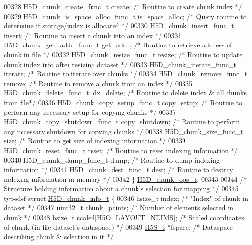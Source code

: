 \begin{DoxyCode}
00328     H5D\_chunk\_create\_func\_t create;         \textcolor{comment}{/* Routine to create chunk index */}
00329     H5D\_chunk\_is\_space\_alloc\_func\_t is\_space\_alloc;    \textcolor{comment}{/* Query routine to determine if storage/index is
       allocated */}
00330     H5D\_chunk\_insert\_func\_t insert;         \textcolor{comment}{/* Routine to insert a chunk into an index */}
00331     H5D\_chunk\_get\_addr\_func\_t get\_addr;     \textcolor{comment}{/* Routine to retrieve address of chunk in file */}
00332     H5D\_chunk\_resize\_func\_t resize;         \textcolor{comment}{/* Routine to update chunk index info after resizing dataset */}
00333     H5D\_chunk\_iterate\_func\_t iterate;       \textcolor{comment}{/* Routine to iterate over chunks */}
00334     H5D\_chunk\_remove\_func\_t \textcolor{keyword}{remove};         \textcolor{comment}{/* Routine to remove a chunk from an index */}
00335     H5D\_chunk\_delete\_func\_t idx\_delete;     \textcolor{comment}{/* Routine to delete index & all chunks from file*/}
00336     H5D\_chunk\_copy\_setup\_func\_t copy\_setup; \textcolor{comment}{/* Routine to perform any necessary setup for copying chunks */}
00337     H5D\_chunk\_copy\_shutdown\_func\_t copy\_shutdown; \textcolor{comment}{/* Routine to perform any necessary shutdown for copying
       chunks */}
00338     H5D\_chunk\_size\_func\_t size;             \textcolor{comment}{/* Routine to get size of indexing information */}
00339     H5D\_chunk\_reset\_func\_t reset;           \textcolor{comment}{/* Routine to reset indexing information */}
00340     H5D\_chunk\_dump\_func\_t dump;             \textcolor{comment}{/* Routine to dump indexing information */}
00341     H5D\_chunk\_dest\_func\_t dest;             \textcolor{comment}{/* Routine to destroy indexing information in memory */}
00342 \} \hyperlink{struct_h5_d__chunk__ops__t}{H5D\_chunk\_ops\_t};
00343 
00344 \textcolor{comment}{/* Structure holding information about a chunk's selection for mapping */}
00345 \textcolor{keyword}{typedef} \textcolor{keyword}{struct }\hyperlink{struct_h5_d__chunk__info__t}{H5D\_chunk\_info\_t} \{
00346     hsize\_t index;              \textcolor{comment}{/* "Index" of chunk in dataset */}
00347     uint32\_t chunk\_points;      \textcolor{comment}{/* Number of elements selected in chunk */}
00348     hsize\_t scaled[H5O\_LAYOUT\_NDIMS];   \textcolor{comment}{/* Scaled coordinates of chunk (in file dataset's dataspace) */}
00349     \hyperlink{struct_h5_s__t}{H5S\_t} *fspace;              \textcolor{comment}{/* Dataspace describing chunk & selection in it */}

\end{DoxyCode}
